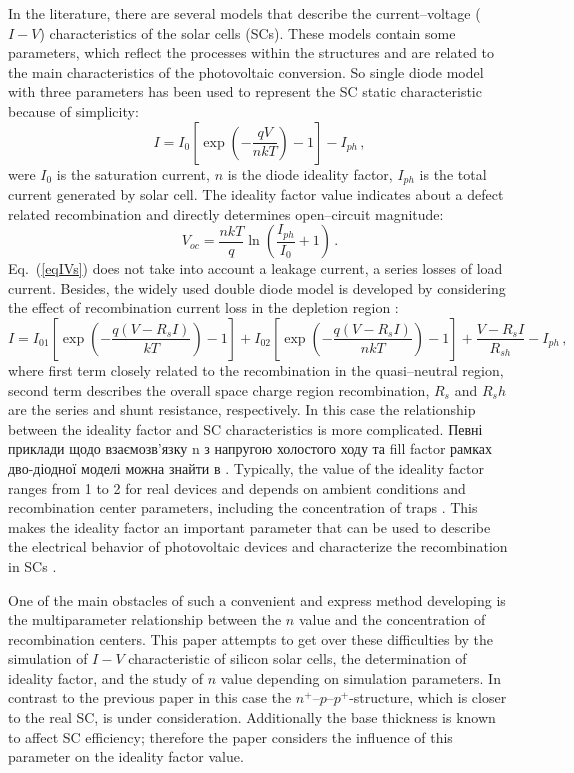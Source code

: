 \documentclass[12pt]{article}
\begin{document}
In the literature, there are several models that describe the current--voltage ($I-V$) characteristics of the solar cells (SCs).
These models contain some parameters, which reflect the processes within the structures and are related to the main characteristics of the photovoltaic conversion.
So single diode model with three parameters has been used to represent the SC static characteristic because of simplicity:
\begin{equation}
\label{eqIVs}
    I=I_{0}\left[\exp\left(-\frac{qV}{nkT}\right)-1\right]-I_{ph}\,,
\end{equation}
were
$I_0$ is the saturation current,
$n$ is the diode ideality factor,
$I_{ph}$ is the total current generated by solar cell.
The ideality factor value indicates about a defect related recombination and directly determines open--circuit magnitude:
\begin{equation}
\label{eqVoc}
    V_{oc}=\frac{nkT}{q}\ln\left(\frac{I_{ph}}{I_0}+1\right)\,.
\end{equation}
Eq.~(\ref{eqIVs}) does not take into account a leakage current, a series losses of load current.
Besides, the widely used double diode model is developed by considering the effect of recombination current loss
in the depletion region \cite{2Diod:Ishaque,2Diod:Buhler,Breitenstein2013}:
\begin{equation}
\label{eqIVd}
    I=I_{01}\left[\exp\left(-\frac{q(V-R_sI)}{kT}\right)-1\right]
      + I_{02}\left[\exp\left(-\frac{q(V-R_sI)}{nkT}\right)-1\right]
      +\frac{V-R_sI}{R_{sh}}
      -I_{ph}\,,
\end{equation}
where
first term closely related to the recombination in the quasi--neutral region,
second term describes the overall space charge region recombination,
$R_s$ and $R_sh$ are the series and shunt resistance, respectively.
In this case the relationship between the ideality factor and SC characteristics is more complicated.
Певні приклади щодо взаємозв'язку n з напругою холостого ходу та fill factor  рамках дво-діодної моделі можна знайти в \cite{Olikh2018SM}.
Typically, the value of the ideality factor ranges from 1 to 2 for real devices and depends on ambient conditions and recombination center parameters,
including the concentration of traps \cite{n2_Beier,n2McIntosh,n2Kaminski,HAMEIRI2013251,Heide}.
This makes the ideality factor an important parameter that can be used to describe the electrical behavior of photovoltaic devices and characterize the recombination in SCs \cite{Duan}.

One of the main obstacles of such a convenient and express method developing is the multiparameter relationship between
the $n$ value and the concentration of recombination centers.
This paper attempts to get over these difficulties by the simulation of $I-V$ characteristic of silicon solar cells,
the determination of ideality factor, and the study of  $n$ value depending on simulation parameters.
In contrast to the previous paper \cite{Olikh2019SM} in this case the $n^+$--$p$--$p^+$-structure,
which is closer to the real SC, is under consideration.
Additionally the base thickness is known \cite{Sach_d,FeB:Schmidt} to affect SC efficiency;
therefore the paper considers the influence of this parameter on the ideality factor value.
\end{document}

